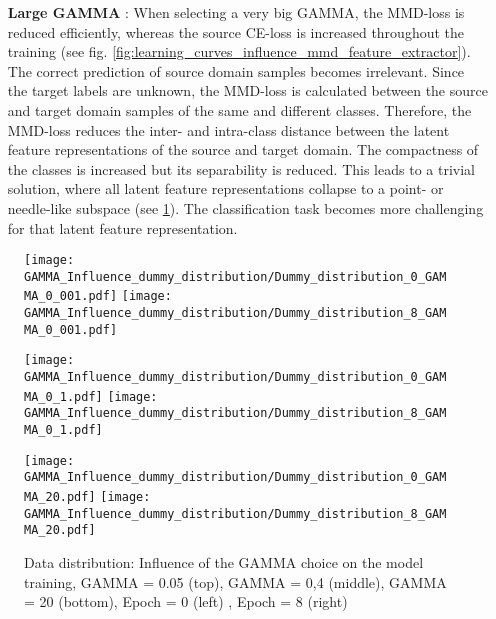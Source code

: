 \begin{itemize}
    \item [\textbf{Large GAMMA}]:
    When selecting a very big GAMMA, the MMD-loss is reduced efficiently, whereas the source CE-loss is increased throughout the training (see fig. \ref{fig:learning_curves_influence_mmd_feature_extractor}). The correct prediction of source domain samples becomes irrelevant. Since the target labels are unknown, the MMD-loss is calculated between the source and target domain samples of the same and different classes. Therefore, the MMD-loss reduces the inter- and intra-class distance between the latent feature representations of the source and target domain. The compactness of the classes is increased but its separability is reduced. This leads to a trivial solution, where all latent feature representations collapse to a point- or needle-like subspace (see \ref{fig:point_cloud_mmd}). The classification task becomes more challenging for that latent feature representation.
\end{itemize}

\begin{figure}[H]
  \centering
  \texttt{[image: GAMMA\_Influence\_dummy\_distribution/Dummy\_distribution\_0\_GAMMA\_0\_001.pdf]}
  \hspace{.4cm}
  \texttt{[image: GAMMA\_Influence\_dummy\_distribution/Dummy\_distribution\_8\_GAMMA\_0\_001.pdf]}

  \vspace{.1cm}

  \texttt{[image: GAMMA\_Influence\_dummy\_distribution/Dummy\_distribution\_0\_GAMMA\_0\_1.pdf]}
  \hspace{.4cm}
  \texttt{[image: GAMMA\_Influence\_dummy\_distribution/Dummy\_distribution\_8\_GAMMA\_0\_1.pdf]}

  \vspace{.1cm}

  \texttt{[image: GAMMA\_Influence\_dummy\_distribution/Dummy\_distribution\_0\_GAMMA\_20.pdf]}
  \hspace{.4cm}
  \texttt{[image: GAMMA\_Influence\_dummy\_distribution/Dummy\_distribution\_8\_GAMMA\_20.pdf]}
 

  \caption{Data distribution: Influence of the GAMMA choice on the model training, GAMMA = 0.05 (top), GAMMA = 0,4 (middle), GAMMA = 20 (bottom), Epoch = 0 (left) , Epoch = 8 (right)}
  \label{fig:point_cloud_mmd}
\end{figure}


